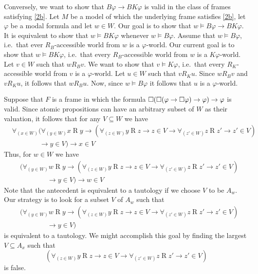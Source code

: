 \documentclass{article}
\begin{document}
\begin{ex}
\begin{enumerate}
Conversely, we want to show that $B\varphi\to BK\varphi$ is valid in the class 
of frames satisfying \ref{2b}. Let $M$ be a model of which the underlying frame
satisfies \ref{2b}, let $\varphi$ be a modal formula and let $w\in W$. Our goal
is to show that $w\models B\varphi\to BK\varphi$. It is equivalent to show that
$w\models BK\varphi$ whenever $w\models B\varphi$. Assume that $w\models B\varphi$,
i.e.~that ever $R_B$-accessible world from $w$ is a $\varphi$-world. Our current
goal is to show that $w\models BK\varphi$, i.e.~that every $R_B$-accessible world
from $w$ is a $K\varphi$-world. Let $v\in W$ such that $w\mathbin{R_B}v$. We
want to show that $v\models K\varphi$, i.e.~that every $R_K$-accessible world from
$v$ is a $\varphi$-world. Let $u\in W$ such that $v\mathbin{R_K} u$. Since
$w\mathbin{R_B} v$ and $v\mathbin{R_K} u$, it follows that $w\mathbin{R_B} u$.
Now, since $w\models B\varphi$ it follows that $u$ is a $\varphi$-world.
\end{enumerate}
\end{ex}

\begin{ex}
Suppose that $F$ is a frame in which the formula 
$\square(\square(\varphi\to\square\varphi)\to\varphi)\to\varphi$ is valid. Since atomic
propositions can have an arbitrary subset of $W$ as their valuation, it follows
that for any $V\subseteq W$ we have
\begin{align*}
& \forall_{(x\in W)}
  (\forall_{(y\in W)} x\mathbin{R}y
  \to (\forall_{(z\in W)} y\mathbin{R}z\to z\in V\to\forall_{(z'\in W)} z\mathbin{R} z'\to z'\in V)
  \\
  & \qquad\qquad \to y\in V) \to x\in V
\end{align*}
Thus, for $w\in W$ we have
\begin{align*}
& (\forall_{(y\in W)} w\mathbin{R}y
  \to (\forall_{(z\in W)} y\mathbin{R}z\to z\in V\to\forall_{(z'\in W)} z\mathbin{R} z'\to z'\in V)
  \\
  & \qquad\qquad \to y\in V) \to w\in V
\end{align*}
Note that the antecedent is equivalent to a tautology if we choose $V$ to be
$A_w$. Our strategy is to look for a subset $V$ of $A_w$ such that
\begin{align*}
& (\forall_{(y\in W)} w\mathbin{R}y
  \to (\forall_{(z\in W)} y\mathbin{R}z\to z\in V\to\forall_{(z'\in W)} z\mathbin{R} z'\to z'\in V)
  \\
  & \qquad\qquad \to y\in V)
\end{align*}
is equivalent to a tautology. We might accomplish this goal by finding the largest
$V\subseteq A_x$ such that
\begin{equation*}
(\forall_{(z\in W)} y\mathbin{R}z\to z\in V\to\forall_{(z'\in W)} z\mathbin{R} z'\to z'\in V)
\end{equation*}
is false.
\end{ex}
\end{document}
